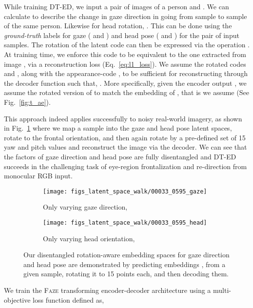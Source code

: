 \documentclass[10pt,twocolumn,letterpaper]{article}
\newcommand{\faze}[0]{\textsc{Faze}\xspace}
\begin{document}
While training DT-ED, we input a pair of images of a person  and . We can calculate  to describe the change in gaze direction in going from sample  to sample  of the same person.
Likewise for head rotation, .
This can be done using the \emph{ground-truth} labels for gaze ( and ) and head pose ( and ) for the pair of input samples.
The rotation of the latent code  can then be expressed via the operation .
At training time, we enforce this code to be equivalent to the one extracted from image , via a reconstruction loss (Eq.~\ref{eq:l1_loss}). 
We assume the rotated codes  and , along with the appearance-code , to be sufficient for reconstructing  through the decoder function such that, . 
More specifically, given the encoder output , we assume the rotated version of  to match the embedding of , that is we assume  (See Fig.~\ref{fig:t_ae}).


This approach indeed applies successfully to noisy real-world imagery, as shown in Fig.~\ref{fig:latent_walks} where we map a sample into the gaze and head pose latent spaces, rotate to the frontal orientation, and then again rotate by a pre-defined set of 15 yaw and pitch values and reconstruct the image via the decoder. We can see that the factors of gaze direction and head pose are fully disentangled
and DT-ED succeeds in the challenging task of eye-region frontalization and re-direction from monocular RGB input.


\begin{figure}[t]
    \centering
    \begin{subfigure}[t]{\columnwidth}
        \texttt{[image: figs\_latent\_space\_walk/00033\_0595\_gaze]} 
        \vskip -1.8mm
        \caption{\small Only varying gaze direction, }
    \end{subfigure}
    \begin{subfigure}[t]{\columnwidth}
        \texttt{[image: figs\_latent\_space\_walk/00033\_0595\_head]}
        \vskip -1.8mm
        \caption{\small Only varying head orientation, }
    \end{subfigure}
    \vskip -2.2mm
    \caption{Our disentangled rotation-aware embedding spaces for gaze direction and head pose are demonstrated by predicting embeddings ,  from a given sample, rotating it to 15 points each, and then decoding them. 
    \label{fig:latent_walks}
    }
    \vspace*{-5mm}
\end{figure}

We train the \faze transforming encoder-decoder architecture using a multi-objective loss function defined as,
\end{document}
